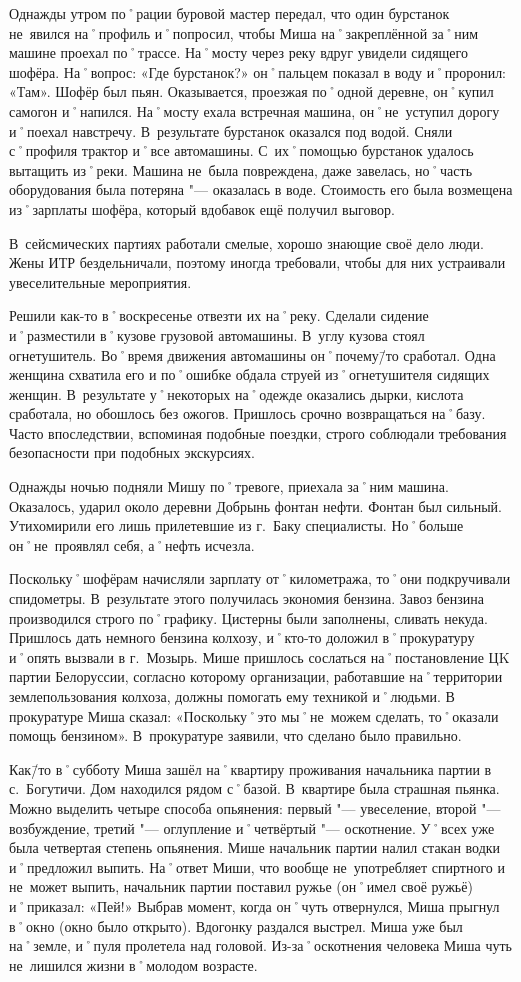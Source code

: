 Однажды утром по˚рации буровой мастер передал, что один бурстанок не~явился на˚профиль и˚попросил, чтобы Миша на˚закреплённой за˚ним машине проехал по˚трассе. На˚мосту через реку вдруг увидели сидящего шофёра. На˚вопрос: «Где бурстанок?» он˚пальцем показал в воду и˚проронил: «Там». Шофёр был пьян. Оказывается, проезжая по˚одной деревне, он˚купил самогон и˚напился. На˚мосту ехала встречная машина, он˚не~уступил дорогу и˚поехал навстречу. В~результате бурстанок оказался под водой. Сняли с˚профиля трактор и˚все автомашины. С~их˚помощью бурстанок удалось вытащить из˚реки. Машина не~была повреждена, даже завелась, но˚часть оборудования была потеряна "--- оказалась в воде. Стоимость его была возмещена из˚зарплаты шофёра, который вдобавок ещё получил выговор. 

В~сейсмических партиях работали смелые, хорошо знающие своё дело люди. Жены ИТР бездельничали, поэтому иногда требовали, чтобы для них устраивали увеселительные мероприятия.

Решили как-то в˚воскресенье отвезти их на˚реку. Сделали сидение и˚разместили в˚кузове грузовой автомашины. В~углу кузова стоял огнетушитель. Во˚время движения автомашины он˚почему\=/то сработал. Одна женщина схватила его и по˚ошибке обдала струей из˚огнетушителя сидящих женщин. В~результате у˚некоторых на˚одежде оказались дырки, кислота сработала, но обошлось без ожогов. Пришлось срочно возвращаться на˚базу. Часто впоследствии, вспоминая подобные поездки, строго соблюдали требования безопасности при подобных экскурсиях.

Однажды ночью подняли Мишу по˚тревоге, приехала за˚ним машина. Оказалось, ударил около деревни Добрынь фонтан нефти. Фонтан был сильный. Утихомирили его лишь прилетевшие из г.~Баку специалисты. Но˚больше он˚не~проявлял себя, а˚нефть исчезла. 

Поскольку˚шофёрам начисляли зарплату от˚километража, то˚они подкручивали спидометры. В~результате этого получилась экономия бензина. Завоз бензина производился строго по˚графику. Цистерны были заполнены, сливать некуда. Пришлось дать немного бензина колхозу, и˚кто-то доложил в˚прокуратуру и˚опять вызвали в г.~Мозырь. Мише пришлось сослаться на˚постановление ЦK партии Белоруссии, согласно которому организации, работавшие на˚территории землепользования колхоза, должны помогать ему техникой и˚людьми. В прокуратуре Миша сказал: «Поскольку˚это мы˚не~можем сделать, то˚оказали помощь бензином». В~прокуратуре заявили, что сделано было правильно.

Как\=/то в˚субботу Миша зашёл на˚квартиру проживания начальника партии в с.~Богутичи. Дом находился рядом с˚базой. В~квартире была страшная пьянка. Можно выделить четыре способа опьянения: первый "--- увеселение, второй "--- возбуждение, третий "--- оглупление и˚четвёртый "--- оскотнение. У˚всех уже была четвертая степень опьянения. Мише начальник партии налил стакан водки и˚предложил выпить. На˚ответ Миши, что вообще не~употребляет спиртного и не~может выпить, начальник партии поставил ружье (он˚имел своё ружьё) и˚приказал: «Пей!» Выбрав момент, когда он˚чуть отвернулся, Миша прыгнул в˚окно (окно было открыто). Вдогонку раздался выстрел. Миша уже был на˚земле, и˚пуля пролетела над головой. Из-за˚оскотнения человека Миша чуть не~лишился жизни в˚молодом возрасте.

